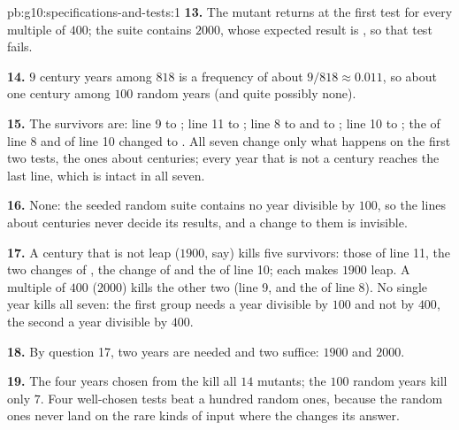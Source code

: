 \begin{solution}{pb:g10:specifications-and-tests:1}
\textbf{13.} The mutant returns  at the first test for every multiple of $400$; the suite contains
$2000$, whose expected result is , so that test fails.

\textbf{14.} $9$ century years among $818$ is a frequency of about $9/818 \approx 0.011$, so about one century among
$100$ random years (and quite possibly none).

\textbf{15.} The survivors are: line 9  to ; line 11  to ; line 8
 to  and  to ; line 10  to ; the  of line 8 and of
line 10 changed to . All seven change only what happens on the first two tests, the ones about centuries;
every year that is not a century reaches the last line, which is intact in all seven.

\textbf{16.} None: the seeded random suite contains no year divisible by $100$, so the lines about centuries never
decide its results, and a change to them is invisible.

\textbf{17.} A century that is not leap ($1900$, say) kills five survivors: those of line 11, the two changes of
, the change of  and the  of line 10; each makes $1900$ leap. A multiple of $400$
($2000$) kills the other two (line 9, and the  of line 8). No single year kills all seven: the first group
needs a year divisible by $100$ and not by $400$, the second a year divisible by $400$.

\textbf{18.} By question 17, two years are needed and two suffice: $1900$ and $2000$.

\textbf{19.} The four years chosen from the  kill all $14$ mutants; the $100$ random years kill only $7$.
Four well-chosen tests beat a hundred random ones, because the random ones never land on the rare kinds of input
where the  changes its answer.
\end{solution}
